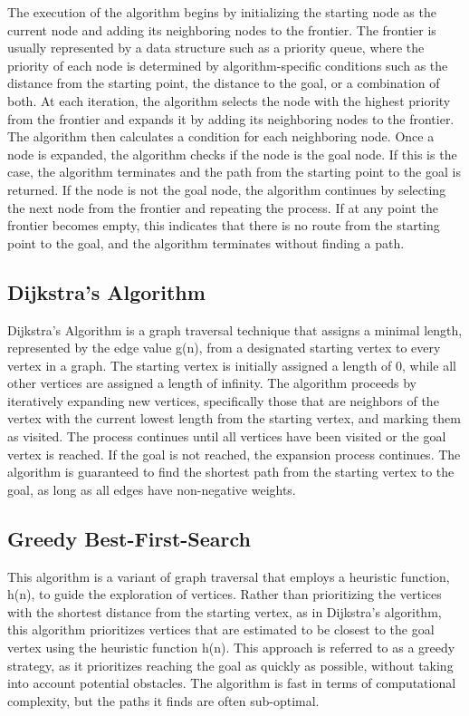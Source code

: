 The execution of the algorithm begins by initializing the starting node as the current node and adding its neighboring nodes to the frontier. The frontier is usually represented by a data structure such as a priority queue, where the priority of each node is determined by algorithm-specific conditions such as the distance from the starting point, the distance to the goal, or a combination of both. At each iteration, the algorithm selects the node with the highest priority from the frontier and expands it by adding its neighboring nodes to the frontier. The algorithm then calculates a condition for each neighboring node. Once a node is expanded, the algorithm checks if the node is the goal node. If this is the case, the algorithm terminates and the path from the starting point to the goal is returned. If the node is not the goal node, the algorithm continues by selecting the next node from the frontier and repeating the process. If at any point the frontier becomes empty, this indicates that there is no route from the starting point to the goal, and the algorithm terminates without finding a path\cite{multiple_path_planning_algos}.
\subsection{Dijkstra's Algorithm}
Dijkstra's Algorithm is a graph traversal technique that assigns a minimal length, represented by the edge value g(n), from a designated starting vertex to every vertex in a graph. The starting vertex is initially assigned a length of 0, while all other vertices are assigned a length of infinity. The algorithm proceeds by iteratively expanding new vertices, specifically those that are neighbors of the vertex with the current lowest length from the starting vertex, and marking them as visited. The process continues until all vertices have been visited or the goal vertex is reached. If the goal is not reached, the expansion process continues. The algorithm is guaranteed to find the shortest path from the starting vertex to the goal, as long as all edges have non-negative weights. \cite{basic_algorithms, basic_2}

\subsection{Greedy Best-First-Search}
This algorithm is a variant of graph traversal that employs a heuristic function, h(n), to guide the exploration of vertices. Rather than prioritizing the vertices with the shortest distance from the starting vertex, as in Dijkstra's algorithm, this algorithm prioritizes vertices that are estimated to be closest to the goal vertex using the heuristic function h(n)\cite{a_star_dijkstra}. This approach is referred to as a greedy strategy, as it prioritizes reaching the goal as quickly as possible, without taking into account potential obstacles. The algorithm is fast in terms of computational complexity, but the paths it finds are often sub-optimal.


